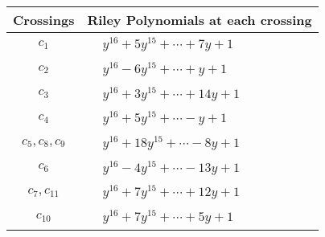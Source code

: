 \documentclass[1p]{elsarticle_modified}
\theoremstyle{definition}
\begin{document}
\begin{tabular}{m{50pt}|m{274pt}}
Crossings & \hspace{64pt}Riley Polynomials at each crossing \\
\hline $$\begin{aligned}c_{1}\end{aligned}$$&$\begin{aligned}
&y^{16}+5 y^{15}+\cdots+7 y+1
\end{aligned}$\\
\hline $$\begin{aligned}c_{2}\end{aligned}$$&$\begin{aligned}
&y^{16}-6 y^{15}+\cdots+y+1
\end{aligned}$\\
\hline $$\begin{aligned}c_{3}\end{aligned}$$&$\begin{aligned}
&y^{16}+3 y^{15}+\cdots+14 y+1
\end{aligned}$\\
\hline $$\begin{aligned}c_{4}\end{aligned}$$&$\begin{aligned}
&y^{16}+5 y^{15}+\cdots- y+1
\end{aligned}$\\
\hline $$\begin{aligned}c_{5},c_{8},c_{9}\end{aligned}$$&$\begin{aligned}
&y^{16}+18 y^{15}+\cdots-8 y+1
\end{aligned}$\\
\hline $$\begin{aligned}c_{6}\end{aligned}$$&$\begin{aligned}
&y^{16}-4 y^{15}+\cdots-13 y+1
\end{aligned}$\\
\hline $$\begin{aligned}c_{7},c_{11}\end{aligned}$$&$\begin{aligned}
&y^{16}+7 y^{15}+\cdots+12 y+1
\end{aligned}$\\
\hline $$\begin{aligned}c_{10}\end{aligned}$$&$\begin{aligned}
&y^{16}+7 y^{15}+\cdots+5 y+1
\end{aligned}$\\
\hline
\end{tabular}\\~\\
\end{document}
